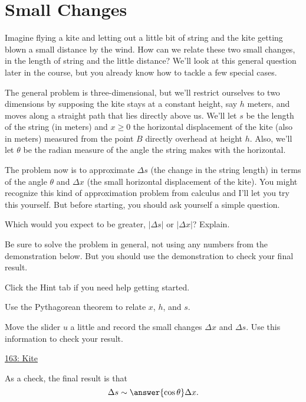 \documentclass{ximera}
\begin{document}
\section*{Small Changes}
Imagine flying a kite and letting out a little bit of string and the kite getting blown a small distance by the wind. How can we relate these two small changes, in the length of string and the little distance? We'll look at this general question later in the course, but you already know how to tackle a few special cases.


\begin{question}  \label{Q:09df0g4444e}
The general problem is three-dimensional, but we'll restrict ourselves to two dimensions by supposing the kite stays at a constant height, say $h$ meters, and moves along a straight path that lies directly above us. We'll let $s$ be the length of the string (in meters) and $x\geq 0$ the horizontal displacement of the kite (also in meters) measured from the point $B$ directly overhead at height $h$. Also, we'll let $\theta$ be the radian measure of the angle the string makes with the horizontal.

The problem now is to approximate $\Delta s$ (the change in the string length) in terms of the angle $\theta$ and $\Delta x$ (the small horizontal displacement of the kite). You might recognize this kind of approximation problem from calculus and I'll let you try this yourself. But before starting, you should ask yourself a simple question. 

\begin{freeResponse}
Which would you expect to be greater, $|\Delta s|$ or $|\Delta x|$? Explain.
\end{freeResponse}

Be sure to solve the problem in general, not using any numbers from the demonstration below. But you should use the demonstration to check your final result.

Click the Hint tab if you need help getting started.

\begin{hint}
Use the Pythagorean theorem to relate $x$, $h$, and $s$. 
\end{hint} 

Move the slider $u$ a little and record the small changes $\Delta x$ and $\Delta s$. Use this information to check your result. 
\begin{onlineOnly}
    \begin{center}
\end{center}
\end{onlineOnly}

\href{https://www.desmos.com/calculator/7yad8xxxt8}{163: Kite}

As a check, the final result is that
\[
    \Delta s \sim \answer{\cos\theta} \Delta x .
\]

\end{question}
\end{document}
